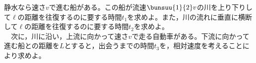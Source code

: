 \hakosyokika
\item 静水なら速さ$v$で進む船がある。この船が流速$\bunsuu{1}{2}v$の川を上り下りして$\ell $の距離を往復するのに要する時間$t_1$を求めよ。また，川の流れに垂直に横断して$\ell $の距離を往復するのに要する時間$t_2$を求めよ。\\
~~次に，川に沿い，上流に向かって速さ$v$で走る自動車がある。下流に向かって進む船との距離を$L$とすると，出会うまでの時間$t_3$を，相対速度を考えることにより求めよ。
